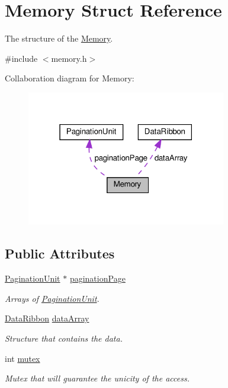 \hypertarget{structMemory}{}\section{Memory Struct Reference}
\label{structMemory}


The structure of the \hyperlink{structMemory}{Memory}.  




{\ttfamily \#include $<$memory.\+h$>$}



Collaboration diagram for Memory\+:
\nopagebreak
\begin{figure}[H]
\begin{center}
\leavevmode
\includegraphics[width=247pt]{structMemory__coll__graph}
\end{center}
\end{figure}
\subsection*{Public Attributes}
\begin{DoxyCompactItemize}
\item 
\mbox{\label{structMemory_a5c5421773412071a94ba3d7acb323277}} 
\hyperlink{structPaginationUnit}{Pagination\+Unit} $\ast$ \hyperlink{structMemory_a5c5421773412071a94ba3d7acb323277}{pagination\+Page}
\begin{DoxyCompactList}\small\item\em Arrays of \hyperlink{structPaginationUnit}{Pagination\+Unit}. \end{DoxyCompactList}\item 
\mbox{\label{structMemory_ab49ab47b347264b74c7ce8252ffd4850}} 
\hyperlink{structDataRibbon}{Data\+Ribbon} \hyperlink{structMemory_ab49ab47b347264b74c7ce8252ffd4850}{data\+Array}
\begin{DoxyCompactList}\small\item\em Structure that contains the data. \end{DoxyCompactList}\item 
\mbox{\label{structMemory_a9dd2c85715ec465afbefc0ce63c2cde8}} 
int \hyperlink{structMemory_a9dd2c85715ec465afbefc0ce63c2cde8}{mutex}
\begin{DoxyCompactList}\small\item\em Mutex that will guarantee the unicity of the access. \end{DoxyCompactList}\end{DoxyCompactItemize}



